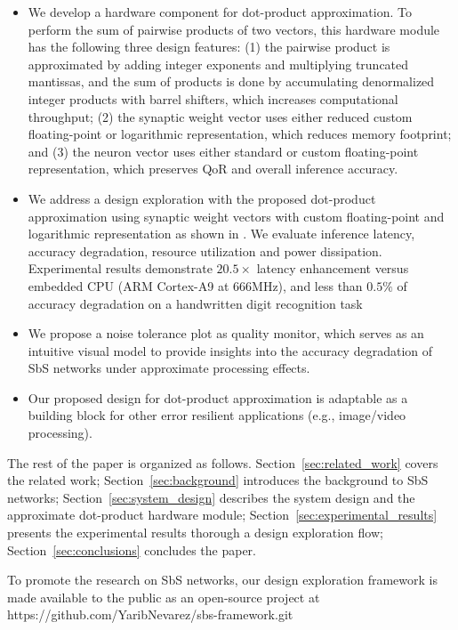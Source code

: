 \begin{itemize}
	\item We develop a hardware component for dot-product approximation. To perform the sum of pairwise products of two vectors, this hardware module has the following three design features: (1) the pairwise product is approximated by adding integer exponents and multiplying truncated mantissas, and the sum of products is done by accumulating denormalized integer products with barrel shifters, which increases computational throughput; (2) the synaptic weight vector uses either reduced custom floating-point or logarithmic representation, which reduces memory footprint; and (3) the neuron vector uses either standard or custom floating-point representation, which preserves QoR and overall inference accuracy.
	\item We address a design exploration with the proposed dot-product approximation using synaptic weight vectors with custom floating-point and logarithmic representation as shown in . We evaluate inference latency, accuracy degradation, resource utilization and power dissipation. Experimental results demonstrate $20.5\times$ latency enhancement versus embedded CPU (ARM Cortex-A9 at $666$MHz), and less than $0.5\%$ of accuracy degradation on a handwritten digit recognition task 
	\item We propose a noise tolerance plot as quality monitor, which serves as an intuitive visual model to provide insights into the accuracy degradation of SbS networks under approximate processing effects.
	\item Our proposed design for dot-product approximation is adaptable as a building block for other error resilient applications (e.g., image/video processing).
\end{itemize}


The rest of the paper is organized as follows. Section~\ref{sec:related_work} covers the related work; Section~\ref{sec:background} introduces the background to SbS networks; Section~\ref{sec:system_design} describes the system design and the approximate dot-product hardware module; Section~\ref{sec:experimental_results} presents the experimental results thorough a design exploration flow; Section~\ref{sec:conclusions} concludes the paper.


To promote the research on SbS networks, our design exploration framework is made available to the public as an open-source project at https://github.com/YaribNevarez/sbs-framework.git

